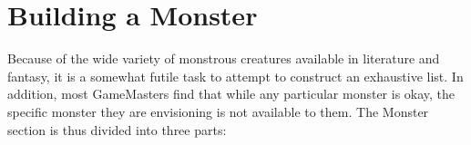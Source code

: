 \documentclass[twoside]{book}
\begin{document}
    

\section{Building a Monster}
     Because of the wide variety of monstrous creatures
             available in literature and fantasy, it is a somewhat futile
             task to attempt to construct an exhaustive list. In
             addition, most GameMasters find that while any particular
             monster is okay, the specific monster they are envisioning
             is not available to them. The Monster section is thus
             divided into three parts: 
\begin{description}
    
  \item[] 
  \item[] 
  \item[] 
\end{description}
  
    
\end{document}
